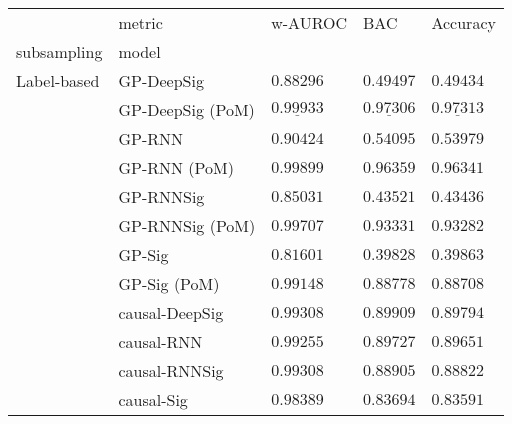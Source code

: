 \begin{tabular}{lllll}
\toprule
       & metric &                               w-AUROC &                                   BAC &                              Accuracy \\
subsampling & model &                                       &                                       &                                       \\
\midrule
Label-based & GP-DeepSig &                           $ 0.88296 $ &                           $ 0.49497 $ &                           $ 0.49434 $ \\
       & GP-DeepSig (PoM) &            $  \underline{ 0.99933 } $ &            $  \underline{ 0.97306 } $ &            $  \underline{ 0.97313 } $ \\
       & GP-RNN &                           $ 0.90424 $ &                           $ 0.54095 $ &                           $ 0.53979 $ \\
       & GP-RNN (PoM) &                           $ 0.99899 $ &                           $ 0.96359 $ &                           $ 0.96341 $ \\
       & GP-RNNSig &                           $ 0.85031 $ &                           $ 0.43521 $ &                           $ 0.43436 $ \\
       & GP-RNNSig (PoM) &                           $ 0.99707 $ &                           $ 0.93331 $ &                           $ 0.93282 $ \\
       & GP-Sig &                           $ 0.81601 $ &                           $ 0.39828 $ &                           $ 0.39863 $ \\
       & GP-Sig (PoM) &                           $ 0.99148 $ &                           $ 0.88778 $ &                           $ 0.88708 $ \\
       & causal-DeepSig &                           $ 0.99308 $ &                           $ 0.89909 $ &                           $ 0.89794 $ \\
       & causal-RNN &                           $ 0.99255 $ &                           $ 0.89727 $ &                           $ 0.89651 $ \\
       & causal-RNNSig &                           $ 0.99308 $ &                           $ 0.88905 $ &                           $ 0.88822 $ \\
       & causal-Sig &                           $ 0.98389 $ &                           $ 0.83694 $ &                           $ 0.83591 $ \\

\end{tabular}
